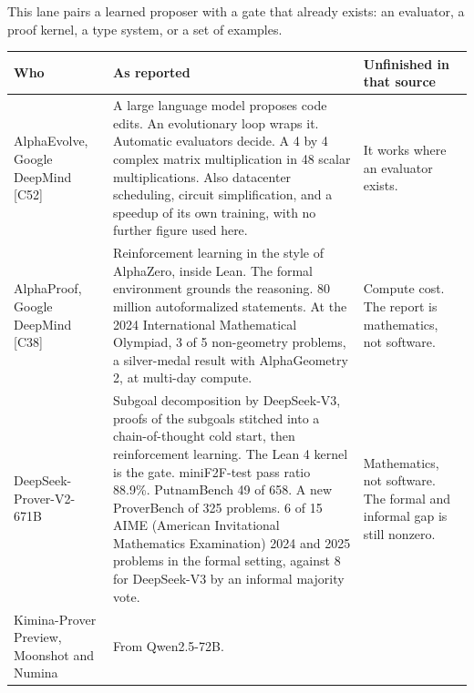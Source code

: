 \documentclass[10pt,letterpaper]{article}
\begin{document}
This lane pairs a learned proposer with a gate that already exists: an
evaluator, a proof kernel, a type system, or a set of examples.

{\footnotesize\setlength{\tabcolsep}{3.8pt}\renewcommand{\arraystretch}{1.15}
\begin{longtable}[]{@{}
  >{\raggedright\arraybackslash}p{}
  >{\raggedright\arraybackslash}p{}
  >{\raggedright\arraybackslash}p{}@{}}
\toprule\noalign{}
\begin{minipage}[b]{\linewidth}\raggedright
\textbf{Who}
\end{minipage} & \begin{minipage}[b]{\linewidth}\raggedright
\textbf{As reported}
\end{minipage} & \begin{minipage}[b]{\linewidth}\raggedright
\textbf{Unfinished in that source}
\end{minipage} \\
\midrule\noalign{}
\endhead
\bottomrule\noalign{}
\endlastfoot
AlphaEvolve, Google DeepMind {[}C52{]} & A large language model proposes
code edits. An evolutionary loop wraps it. Automatic evaluators decide.
A 4 by 4 complex matrix multiplication in 48 scalar multiplications.
Also datacenter scheduling, circuit simplification, and a speedup of its
own training, with no further figure used here. & It works where an
evaluator exists. \\
AlphaProof, Google DeepMind {[}C38{]} & Reinforcement learning in the
style of AlphaZero, inside Lean. The formal environment grounds the
reasoning. 80 million autoformalized statements. At the 2024
International Mathematical Olympiad, 3 of 5 non-geometry problems, a
silver-medal result with AlphaGeometry 2, at multi-day compute. &
Compute cost. The report is mathematics, not software. \\
DeepSeek-Prover-V2-671B & Subgoal decomposition by DeepSeek-V3, proofs
of the subgoals stitched into a chain-of-thought cold start, then
reinforcement learning. The Lean 4 kernel is the gate. miniF2F-test pass
ratio 88.9\%. PutnamBench 49 of 658. A new ProverBench of 325 problems.
6 of 15 AIME (American Invitational Mathematics Examination) 2024 and
2025 problems in the formal setting, against 8 for DeepSeek-V3 by an
informal majority vote. & Mathematics, not software. The formal and
informal gap is still nonzero. \\
Kimina-Prover Preview, Moonshot and Numina & From Qwen2.5-72B.

\end{longtable}}
\end{document}
